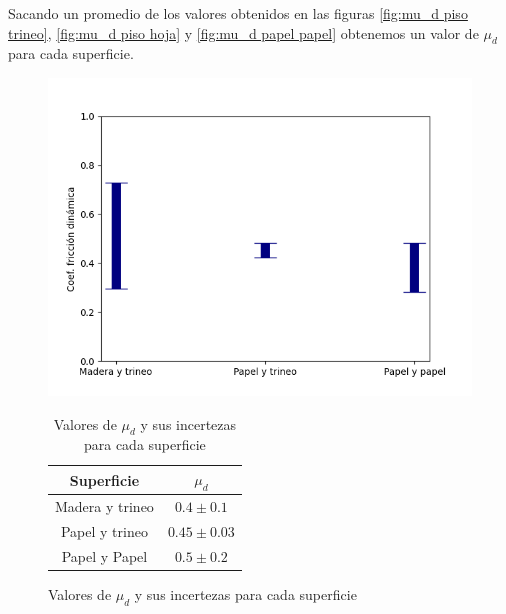 \documentclass[12pt,a4]{article}
\begin{document}
Sacando un promedio de los valores obtenidos en las figuras \ref{fig:mu_d piso trineo}, \ref{fig:mu_d piso hoja} y \ref{fig:mu_d papel papel} obtenemos un valor de $\mu_d$ para cada superficie.

\begin{figure}[H]
    \begin{minipage}{0.5\textwidth}
        \centering
        \includegraphics[width=0.9\linewidth]{ud_Combined.png}
        \caption{Promedio de $\mu_d$ para cada superficie}
        \label{fig:mu_d promedio}
    \end{minipage}\hfill
    \begin{minipage}{0.5\textwidth}
        \centering
        \begin{table}[H]
            \centering
            \begin{tabular}{|c|c|}
                \hline
                \textbf{Superficie} & \textbf{$\mu_d$}\\
                \hline
                Madera y trineo & $0.4 \pm 0.1$\\
                Papel y trineo & $0.45 \pm 0.03$ \\
                Papel y Papel & $0.5 \pm 0.2$ \\
                \hline
            \end{tabular}
            \caption{Valores de $\mu_d$ y sus incertezas para cada superficie}
            \label{tab:mu_d}
        \end{table}
    \end{minipage}
\end{figure}
\end{document}

